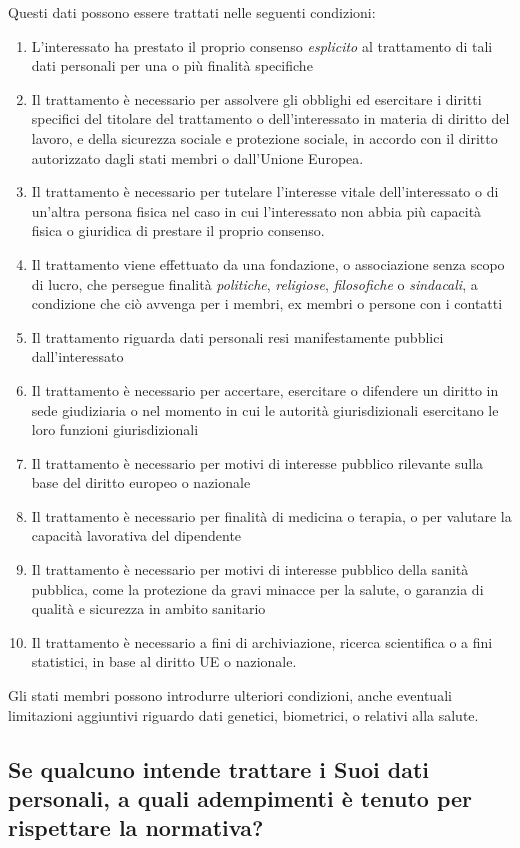 Questi dati possono essere trattati nelle seguenti condizioni:
\begin{enumerate}
    \item L'interessato ha prestato il proprio consenso \textit{esplicito} al trattamento di tali dati personali per una o più finalità specifiche
    \item Il trattamento è necessario per assolvere gli obblighi ed esercitare i diritti specifici del titolare del trattamento o dell'interessato in materia di diritto del lavoro, e della sicurezza sociale e protezione sociale, in accordo con il diritto autorizzato dagli stati membri o dall'Unione Europea.
    \item Il trattamento è necessario per tutelare l'interesse vitale dell'interessato o di un'altra persona fisica nel caso in cui l'interessato non abbia più capacità fisica o giuridica di prestare il proprio consenso.
    \item Il trattamento viene effettuato da una fondazione, o associazione senza scopo di lucro, che persegue finalità \textit{politiche}, \textit{religiose}, \textit{filosofiche} o \textit{sindacali}, a condizione che ciò avvenga per i membri, ex membri o persone con i contatti
    \item Il trattamento riguarda dati personali resi manifestamente pubblici dall'interessato
    \item Il trattamento è necessario per accertare, esercitare o difendere un diritto in sede giudiziaria o nel momento in cui le autorità giurisdizionali esercitano le loro funzioni giurisdizionali
    \item Il trattamento è necessario per motivi di interesse pubblico rilevante sulla base del diritto europeo o nazionale
    \item Il trattamento è necessario per finalità di medicina o terapia, o per valutare la capacità lavorativa del dipendente
    \item Il trattamento è necessario per motivi di interesse pubblico della sanità pubblica, come la protezione da gravi minacce per la salute, o garanzia di qualità e sicurezza in ambito sanitario
    \item Il trattamento è necessario a fini di archiviazione, ricerca scientifica o a fini statistici, in base al diritto UE o nazionale.
\end{enumerate}
Gli stati membri possono introdurre ulteriori condizioni, anche eventuali limitazioni aggiuntivi riguardo dati genetici, biometrici, o relativi alla salute.
\subsection{Se qualcuno intende trattare i Suoi dati personali, a quali adempimenti è tenuto per rispettare la normativa?}

